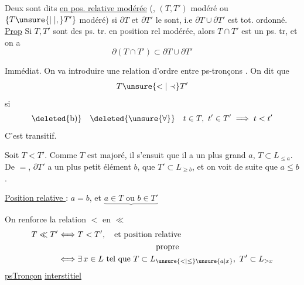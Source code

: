  Deux   sont dits \uline{en pos. relative modérée} (, $(T,T')$  modéré ou $\{T\unsure{\mid|,}T'\}$ modéré) si $\partial T$ et $\partial T'$ le sont, i.e $\partial T\cup\partial T'$ est tot. ordonné.
\noindent\llap{\rule[-1.05\baselineskip]{0.4pt}{1.85\baselineskip}\hspace{0.65em}}\uline{Prop} Si $T,T'$ sont des ps. tr. en position rel modérée, alors $T\cap T'$ est  un ps. tr, et on a
\[
\partial(T\cap T')\subset\partial T\cup\partial T'
\]

Immédiat. On va introduire une relation d'ordre entre ps-tronçons . On dit que
\[
T\unsure{<|\prec}T'
\]
si 
\[
\deleted{\text{b)}}\quad\deleted{\unsure{\forall}}\quad t\in T,\ t'\in T'\implies t<t'
\]
C'est  transitif.

Soit $T<T'$. Comme $T$ est majoré, il s'ensuit que  il a un plus grand   $a$,   $T\subset L_{\leq a}$.  De $=$, $\partial T'$ a un plus petit élément $b$,  que $T'\subset L_{\geq b}$,   et on voit de suite que $a\leq b$.

\uline{Position relative  } : $a=b$, et $\underbrace{a\in T\text{ ou }b\in T'}$%


On renforce la relation $<$ en $\ll$
\[
\begin{aligned}
T\ll T' &\Longleftrightarrow T<T',\quad\text{et position relative}\\
&\hspace{12em}\text{propre}\\
&\Longleftrightarrow \exists\,x\in L\text{ tel que }T\subset L_{\unsure{<|\leq}\unsure{a|x}},\ T'\subset L_{>x}
\end{aligned}
\]
\uline{psTronçon} \uline{interstitiel}

